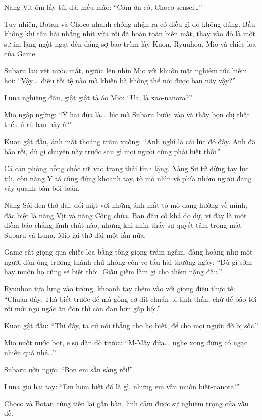 \documentclass[../main.tex]{subfiles}
\begin{document}
Nàng Vịt ôm lấy túi đá, mếu mão: ``Cảm ơn cô, Choco-sensei\dots''

Tuy nhiên, Botan và Choco nhanh chóng nhận ra có điều gì đó không đúng. Bầu không khí tấu hài nhắng nhít vừa rồi đã hoàn toàn biến mất, thay vào đó là một sự im lặng ngột ngạt đến đáng sợ bao trùm lấy Kuon, Ryuuhou, Mio và chiếc loa của Game.

Subaru lau vệt nước mắt, ngước lên nhìn Mio với khuôn mặt nghiêm túc hiếm hoi: ``Vậy\dots\ điều tồi tệ nào mà khiến bà không thể nói được ban nãy vậy?''

Luna nghiêng đầu, giật giật tà áo Mio: ``Ụa, là xao-nanora?''

Mio ngập ngừng: ``Ý hai đứa là\dots\ lúc mà Subaru bước vào và thấy bọn chị thất thểu ủ rũ ban nãy á?''

Kuon gật đầu, ánh mắt thoáng trầm xuống: ``Anh nghĩ là cái lúc đó đấy. Anh đã bảo rồi, dù gì chuyện này trước sau gì mọi người cũng phải biết thôi.''

Cả căn phòng bỗng chốc rơi vào trạng thái tĩnh lặng. Nàng Sư tử dừng tay lục túi, còn nàng Y tá cũng đứng khoanh tay, tò mò nhìn về phía nhóm người đang vây quanh bàn bói toán.

Nàng Sói đen thở dài, đối mặt với những ánh mắt tò mò đang hướng về mình, đặc biệt là nàng Vịt và nàng Công chúa. Ban đầu cô khá do dự, vì đây là một điềm báo chẳng lành chút nào, nhưng khi nhìn thấy sự quyết tâm trong mắt Subaru và Luna, Mio lại thở dài một lần nữa.

Game cất giọng qua chiếc loa bằng tông giọng trầm ngâm, đàng hoàng như một người đàn ông trưởng thành chứ không còn vẻ tấu hài thường ngày: ``Dù gì sớm hay muộn họ cũng sẽ biết thôi. Giấu giếm làm gì cho thêm nặng đầu.''

Ryuuhou tựa lưng vào tường, khoanh tay chêm vào với giọng điệu thực tế: ``Chuẩn đấy. Thà biết trước để mà gồng cơ đít chuẩn bị tinh thần, chứ để bão tới rồi mới ngơ ngác ăn đòn thì còn đau hơn gấp bội.''

Kuon gật đầu: ``Thì đấy, ta cứ nói thẳng cho họ biết, để cho mọi người đỡ bị sốc.''

Mio nuốt nước bọt, e sợ dặn dò trước: ``M-Mấy đứa\dots\ nghe xong đừng có ngạc nhiên quá nhé\dots''

Subaru ưỡn ngực: ``Bọn em sẵn sàng rồi!''

Luna giơ hai tay: ``Em hơm biết đó là gì, nhưng em vẫn muốn biết-nanora!''

Choco và Botan cũng tiến lại gần bàn, linh cảm được sự nghiêm trọng của vấn đề.
\end{document}
